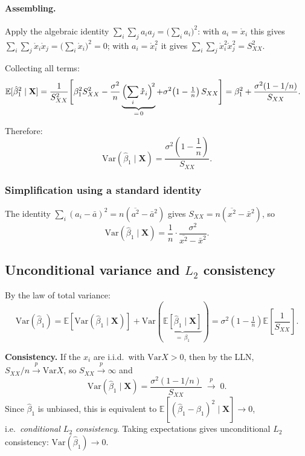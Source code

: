 \documentclass[a4paper,oneside,12pt]{extarticle}
\theoremstyle{plain}
\theoremstyle{definition}
\theoremstyle{remark}
\newcommand*{\E}{\mathbb{E}}
\newcommand*{\Var}{\mathrm{Var}}
\begin{document}
\paragraph{Assembling.}
Apply the algebraic identity $\sum_i\sum_j a_ia_j = \bigl(\sum_i a_i\bigr)^2$:
with $a_i = \mathring{x}_i$ this gives $\sum_i\sum_j\mathring{x}_i\mathring{x}_j
= \bigl(\sum_i\mathring{x}_i\bigr)^2 = 0$; with $a_i = \mathring{x}_i^2$ it
gives $\sum_i\sum_j\mathring{x}_i^2\mathring{x}_j^2 = S_{XX}^2$.

Collecting all terms:
\begin{align*}
  \E[\hat\beta_1^2\mid\mathbf{X}]
  &= \frac{1}{S_{XX}^2}\Biggl[
      \beta_1^2 S_{XX}^2
      - \frac{\sigma^2}{n}\underbrace{\Bigl(\sum_i\mathring{x}_i\Bigr)^{\!2}}_{=\,0}
      + \sigma^2\!\left(1-\tfrac{1}{n}\right)S_{XX}
     \Biggr]
   = \beta_1^2 + \frac{\sigma^2(1-1/n)}{S_{XX}}.
\end{align*}

Therefore:
\[
  \boxed{
    \Var(\hat\beta_1\mid\mathbf{X})
    = \frac{\sigma^2\!\left(1 - \dfrac{1}{n}\right)}{S_{XX}}.
  }
\]

\subsubsection{Simplification using a standard identity}

The identity $\sum_i(a_i-\bar a)^2 = n(\overline{a^2} - \bar{a}^2)$
gives $S_{XX} = n(\overline{x^2}-\bar x^2)$, so
\[
  \Var(\hat\beta_1\mid\mathbf{X})
  = \frac{1}{n}\cdot\frac{\sigma^2}{\overline{x^2}-\bar x^2}.
\]

\subsection{Unconditional variance and \texorpdfstring{$L_2$}{L2} consistency}

By the law of total variance:
\[
  \Var(\hat\beta_1)
  = \E\!\left[\Var(\hat\beta_1\mid\mathbf{X})\right] + \Var\!\left(\underbrace{\E[\hat\beta_1\mid\mathbf{X}]}_{=\,\beta_1}\right)
  = \sigma^2\!\left(1-\tfrac{1}{n}\right)\E\!\left[\frac{1}{S_{XX}}\right].
\]

\textbf{Consistency.}
If the $x_i$ are i.i.d.\ with $\Var X > 0$, then by the LLN,
$S_{XX}/n \xrightarrow{p} \Var X$, so $S_{XX} \xrightarrow{p} \infty$ and
\[
  \Var(\hat\beta_1\mid\mathbf{X})
  = \frac{\sigma^2(1-1/n)}{S_{XX}} \;\xrightarrow{p}\; 0.
\]
Since $\hat\beta_1$ is unbiased, this is equivalent to
$\E[(\hat\beta_1-\beta_1)^2\mid\mathbf{X}]\to 0$, i.e.\ \emph{conditional
$L_2$ consistency}.  Taking expectations gives unconditional $L_2$ consistency:
$\Var(\hat\beta_1)\to 0$.
\end{document}
